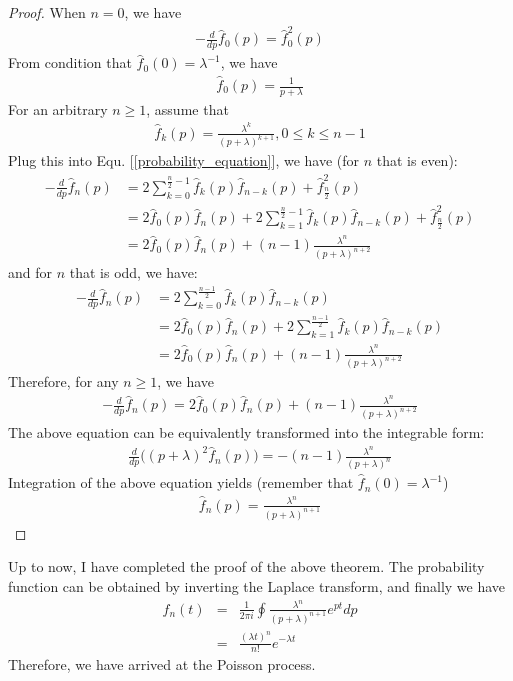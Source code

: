 \documentclass[10pt]{article}
\numberwithin{figure}{section}
\numberwithin{equation}{section}
\begin{document}
\begin{proof}
When $n = 0$, we have 
\begin{eqnarray}
-\frac{d}{dp}\hat{f}_{0}(p) = \hat{f}^2_{0}(p)
\end{eqnarray}
From condition that $\hat{f}_{0}(0) = \lambda^{-1}$, we have 
\begin{eqnarray}
\hat{f}_{0}(p) = \frac{1}{p + \lambda}
\end{eqnarray}
For an arbitrary $n \ge 1$, assume that 
\begin{eqnarray}
\hat{f}_{k}(p) = \frac{\lambda^{k}}{(p + \lambda)^{k+1}}, 0 \le k \le n - 1
\end{eqnarray}
Plug this into Equ. [\ref{probability_equation}], we have (for $n$ that is even):
\begin{align}
 -\frac{d}{dp}\hat{f}_{n}(p) &= 2\sum_{k= 0}^{\frac{n}{2} - 1} \hat{f}_{k} (p)\hat{f}_{n - k}(p) + \hat{f}_{\frac{n}{2}}^2(p) \\\nonumber
  &= 2\hat{f}_{0}(p)\hat{f}_{n}(p) + 2\sum_{k= 1}^{\frac{n}{2} - 1} \hat{f}_{k} (p)\hat{f}_{n - k}(p) + \hat{f}_{\frac{n}{2}}^2(p) \\\nonumber
   &= 2\hat{f}_{0}(p)\hat{f}_{n}(p) + (n-1)\frac{\lambda^n}{(p + \lambda)^{n+2}}
\end{align}
and for $n$ that is odd, we have:
\begin{align} 
-\frac{d}{dp}\hat{f}_{n}(p) &= 2\sum_{k= 0}^{\frac{n - 1}{2}} \hat{f}_{k} (p)\hat{f}_{n - k}(p) \\\nonumber
 &= 2\hat{f}_{0}(p)\hat{f}_{n}(p) +2\sum_{k= 1}^{\frac{n - 1}{2}} \hat{f}_{k} (p)\hat{f}_{n - k}(p) \\\nonumber
  &= 2\hat{f}_{0}(p)\hat{f}_{n}(p) + (n-1)\frac{\lambda^n}{(p + \lambda)^{n+2}}
 \end{align}
Therefore, for any $n \ge 1$, we have 
\begin{eqnarray}
-\frac{d}{dp}\hat{f}_{n}(p) = 2\hat{f}_{0}(p)\hat{f}_{n}(p) + (n-1)\frac{\lambda^n}{(p + \lambda)^{n+2}}
\end{eqnarray}
The above equation can be equivalently transformed into the integrable form: 
\begin{eqnarray}
\frac{d}{dp}\Big( (p + \lambda)^2 \hat{f}_{n}(p)\Big) = -(n - 1)\frac{\lambda^n}{(p + \lambda)^{n}}
\end{eqnarray}
Integration of the above equation yields (remember that $\hat{f}_{n}(0) = \lambda^{-1}$)
\begin{eqnarray}
\hat{f}_{n}(p) = \frac{\lambda^{n}}{(p + \lambda)^{n+1}}
\end{eqnarray}
\end{proof}
Up to now, I have completed the proof of the above theorem. The probability function can be obtained by inverting the Laplace transform, and finally we have 
\begin{eqnarray}
f_{n}(t) &=& \frac{1}{2\pi i}\oint \frac{\lambda^{n}}{(p + \lambda)^{n+1}} e^{pt} dp \\\nonumber
&=& \frac{(\lambda t)^n}{n!} e^{-\lambda t}
\end{eqnarray}
Therefore, we have arrived at the Poisson process. 
\end{document}
